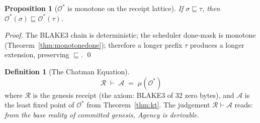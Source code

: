 \documentclass[12pt,a4paper]{article}
\newtheorem{proposition}[theorem]{Proposition}
\theoremstyle{definition}
\newtheorem{definition}[theorem]{Definition}
\theoremstyle{remark}
\newcommand{\Ostar}{\mathcal{O}^{*}}
\newcommand{\Agency}{\mathcal{A}}
\newcommand{\Reality}{\mathcal{R}}
\begin{document}
\begin{proposition}[$\Ostar$ is monotone on the receipt lattice]
If $\sigma \sqsubseteq \tau$, then $\Ostar(\sigma) \sqsubseteq \Ostar(\tau)$.
\end{proposition}
\begin{proof}
The BLAKE3 chain is deterministic; the scheduler done-mask is monotone
(Theorem~\ref{thm:monotonedone});
therefore a longer prefix $\tau$ produces a longer extension,
preserving $\sqsubseteq$. \qed
\end{proof}

\begin{definition}[The Chatman Equation]
\label{def:chatman}
\[
  \boxed{\Reality \;\vdash\; \Agency \;=\; \mu(\Ostar)}
\]
where $\Reality$ is the genesis receipt (the axiom: BLAKE3 of 32 zero bytes),
and $\Agency$ is the least fixed point of $\Ostar$ from Theorem~\ref{thm:kt}.
The judgement $\Reality \vdash \Agency$ reads:
\emph{from the base reality of committed genesis, Agency is derivable.}
\end{definition}
\end{document}
